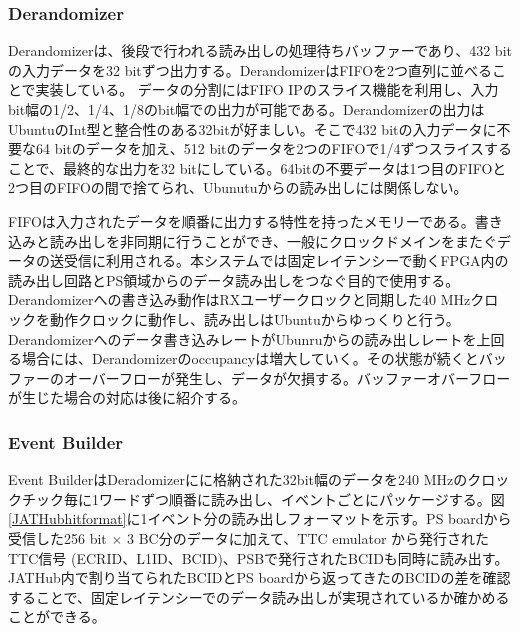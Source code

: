 \subsubsection{Derandomizer} \par
Derandomizerは、後段で行われる読み出しの処理待ちバッファーであり、432 bitの入力データを32 bitずつ出力する。DerandomizerはFIFOを2つ直列に並べることで実装している。
データの分割にはFIFO IPのスライス機能を利用し、入力bit幅の1/2、1/4、1/8のbit幅での出力が可能である。Derandomizerの出力はUbuntuのInt型と整合性のある32bitが好ましい。そこで432 bitの入力データに不要な64 bitのデータを加え、512 bitのデータを2つのFIFOで1/4ずつスライスすることで、最終的な出力を32 bitにしている。64bitの不要データは1つ目のFIFOと2つ目のFIFOの間で捨てられ、Ubunutuからの読み出しには関係しない。\par
FIFOは入力されたデータを順番に出力する特性を持ったメモリーである。書き込みと読み出しを非同期に行うことができ、一般にクロックドメインをまたぐデータの送受信に利用される。本システムでは固定レイテンシーで動くFPGA内の読み出し回路とPS領域からのデータ読み出しをつなぐ目的で使用する。Derandomizerへの書き込み動作はRXユーザークロックと同期した40 MHzクロックを動作クロックに動作し、読み出しはUbuntuからゆっくりと行う。Derandomizerへのデータ書き込みレートがUbunruからの読み出しレートを上回る場合には、Derandomizerのoccupancyは増大していく。その状態が続くとバッファーのオーバーフローが発生し、データが欠損する。バッファーオバーフローが生じた場合の対応は後に紹介する。
\baselineskip

\subsubsection{Event Builder} \par
Event BuilderはDeradomizerにに格納された32bit幅のデータを240 MHzのクロックチック毎に1ワードずつ順番に読み出し、イベントごとにパッケージする。図\ref{JATHubhitformat}に1イベント分の読み出しフォーマットを示す。PS boardから受信した256 bit $\times$ 3 BC分のデータに加えて、TTC emulator から発行されたTTC信号 (ECRID、L1ID、BCID)、PSBで発行されたBCIDも同時に読み出す。JATHub内で割り当てられたBCIDとPS boardから返ってきたのBCIDの差を確認することで、固定レイテンシーでのデータ読み出しが実現されているか確かめることができる。
\baselineskip

